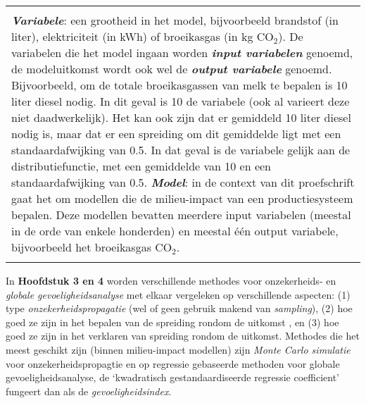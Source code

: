 \documentclass[12pt]{amsart}
\begin{document}
{\vspace{0.5cm}
\footnotesize{
\begin{tabular}{|p{}|}
\hline
\mbox{}\\
\textit{\textbf{Variabele}}: een grootheid in het model, bijvoorbeeld brandstof (in liter), elektriciteit (in kWh) of broeikasgas (in kg CO$_2$). De variabelen die het model ingaan worden \textit{\textbf{input variabelen}} genoemd, de modeluitkomst wordt ook wel de \textit{\textbf{output variabele}} genoemd.  Bijvoorbeeld, om de totale broeikasgassen van melk te bepalen is 10 liter diesel nodig. In dit geval is 10 de variabele (ook al varieert deze niet daadwerkelijk). Het kan ook zijn dat er gemiddeld 10 liter diesel nodig is, maar dat er een spreiding om dit gemiddelde ligt met een standaardafwijking van 0.5. In dat geval is de variabele gelijk aan de distributiefunctie, met een gemiddelde van 10 en een standaardafwijking van 0.5. 
\textit{\textbf{Model}}: in de context van dit proefschrift gaat het om modellen die de milieu-impact van een productiesysteem bepalen. Deze modellen bevatten meerdere input variabelen (meestal in de orde van enkele honderden) en meestal \'{e}\'{e}n output variabele, bijvoorbeeld het broeikasgas CO$_2$.\\ 
\mbox{}\\ \hline
\end{tabular}}
\vspace{0.5cm}

\normalsize{
In \textbf{Hoofdstuk 3 en 4} worden verschillende methodes voor onzekerheids- en \textit{globale gevoeligheidsanalyse} met elkaar vergeleken op verschillende aspecten: (1) type \textit{onzekerheidspropagatie} (wel of geen gebruik makend van \textit{sampling}), (2) hoe goed ze zijn in het bepalen van de spreiding rondom de uitkomst , en (3) hoe goed ze zijn in het verklaren van spreiding rondom de uitkomst. Methodes die het meest geschikt zijn (binnen milieu-impact modellen) zijn \textit{Monte Carlo simulatie} voor onzekerheidspropagtie en op regressie gebaseerde methoden voor globale gevoeligheidsanalyse, de `kwadratisch gestandaardiseerde regressie coefficient' fungeert dan als de \textit{gevoeligheidsindex}.

}}
\end{document}
